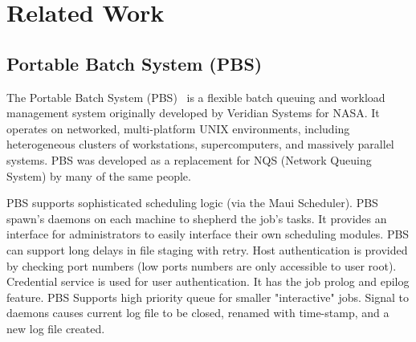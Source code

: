 \section{Related Work}
\subsection*{Portable Batch System (PBS)}

The Portable Batch System (PBS)~\cite{PBS}
is a flexible batch queuing and
workload management system originally developed by Veridian Systems
for NASA.  It operates on networked, multi-platform UNIX environments,
including heterogeneous clusters of workstations, supercomputers, and
massively parallel systems. PBS was developed as a replacement for
NQS (Network Queuing System) by many of the same people.

PBS supports sophisticated scheduling logic (via the Maui
Scheduler).
PBS spawn's daemons on each
machine to shepherd the job's tasks.
It provides an interface for administrators to easily
interface their own scheduling modules.  PBS can support
long delays in file staging with retry.  Host
authentication is provided by checking port numbers (low ports numbers are only
accessible to user root).  Credential service is used for user authentication.
It has the job prolog and epilog feature.
PBS Supports
high priority queue for smaller "interactive" jobs.  Signal to daemons
causes current log file to be closed, renamed with
time-stamp, and a new log file created.

